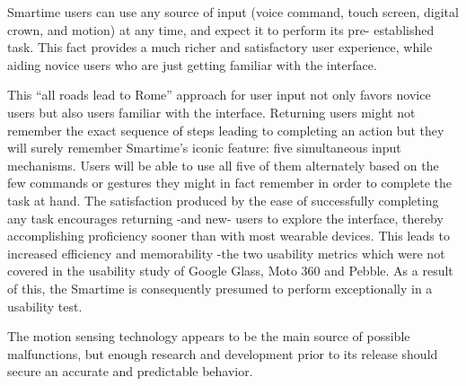 \documentclass{article}
\begin{document}
Smartime users can use any source of input (voice command, touch screen, digital crown, and motion) at any time, and expect it to perform its pre- established task. This fact provides a much richer and satisfactory user experience, while aiding novice users who are just getting familiar with the interface. 

This ``all roads lead to Rome'' approach for user input not only favors novice users but also users familiar with the interface. Returning users might not remember the exact sequence of steps leading to completing an action but they will surely remember Smartime's iconic feature: five simultaneous input mechanisms. Users will be able to use all five of them alternately based on the few commands or gestures they might in fact remember in order to complete the task at hand.  The satisfaction produced by the ease of successfully completing any task encourages returning -and new- users to explore the interface, thereby accomplishing proficiency sooner than with most wearable devices.  This leads to increased efficiency and memorability -the two usability metrics which were not covered in the usability study of Google Glass, Moto 360 and Pebble.\cite{nielsen2009} 
As a result of this, the Smartime is consequently presumed to perform exceptionally in a usability test. 

The motion sensing technology appears to be the main source of possible malfunctions, but enough research and development prior to its release should secure an accurate and predictable behavior.





\end{document}
